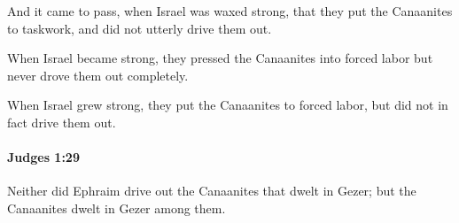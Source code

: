 			\begin{versebox}
					\item[BHS] 
					\item[ASV] And it came to pass, when Israel was waxed strong, that they put the Canaanites to taskwork, and did not utterly drive them out.
					\item[NIV] When Israel became strong, they pressed the Canaanites into forced labor but never drove them out completely.
					\item[NRSV] When Israel grew strong, they put the Canaanites to forced labor, but did not in fact drive them out.
			\end{versebox}

		\paragraph{Judges 1:29} %
			\label{JUDGES-1-29}

			Neither did Ephraim drive out the Canaanites that dwelt in Gezer; but the Canaanites dwelt in Gezer among them.

